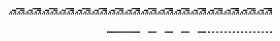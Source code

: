 \documentclass[10pt]{article}
\theoremstyle{plain}
\theoremstyle{definition}
\begin{document}
\begin{table*}[b]
{\begin{minipage}{5.32in}
\[\begin{array}{@{}r@{}}
\begin{array}{@{}l@{}}
\a\a\a\a\a\a\a\a\b\b\b\b\b\b\b\b\a\a\a\a\a\a\a\a\b\b\b\b\b\b\b\b\a\a\a\a \a\a\a\a\b\b\b\b\b\b\b\b\a\a\a\a\a\a\a\a\b\b\b\b\b\b\b\b\a\a\a\a\a\a\a\a \b\b\b\b\b\b\b\b\a\a\a\a\a\a\a\a\b\b\b\b\b\b\b\b\a\a\a\a\a\a\a\a\b\b\b\b \b\b\b\b\a\a\a\a\a\a\a\a\b\b\b\b\b\b\b\b\a\a\a\a\a\a\a\a\b\b\b\b\b\b\b\b \a\a\a\a\a\a\a\a\b\b\b\b\b\b\b\b\a\a\a\a\a\a\a\a\b\b\b\b\b\b\b\b\a\a\a\a \a\a\a\a\b\b\b\b\b\b\b\b\a\a\a\a\a\a\a\a\b\b\b\b\b\b\b\b\a\a\a\a\a\a\a\a \b\b\b\b\b\b\b\b\a\a\a\a\a\a\a\a\b\b\b\b\b\b\b\b\a\a\a\a\a\a\a\a\b\b\b\b \b\b\b\b\mynl
\a\a\a\a\b\b\b\b\a\a\a\a\b\b\b\b\a\a\a\a\b\b\b\b\a\a\a\a\b\b\b\b\a\a\a\a \b\b\b\b\a\a\a\a\b\b\b\b\a\a\a\a\b\b\b\b\a\a\a\a\b\b\b\b\a\a\a\a\b\b\b\b \a\a\a\a\b\b\b\b\a\a\a\a\b\b\b\b\a\a\a\a\b\b\b\b\a\a\a\a\b\b\b\b\a\a\a\a \b\b\b\b\a\a\a\a\b\b\b\b\a\a\a\a\b\b\b\b\a\a\a\a\b\b\b\b\a\a\a\a\b\b\b\b \a\a\a\a\b\b\b\b\a\a\a\a\b\b\b\b\a\a\a\a\b\b\b\b\a\a\a\a\b\b\b\b\a\a\a\a \b\b\b\b\a\a\a\a\b\b\b\b\a\a\a\a\b\b\b\b\a\a\a\a\b\b\b\b\a\a\a\a\b\b\b\b \a\a\a\a\b\b\b\b\a\a\a\a\b\b\b\b\a\a\a\a\b\b\b\b\a\a\a\a\b\b\b\b\a\a\a\a \b\b\b\b\mynl
\a\a\b\b\a\a\b\b\a\a\b\b\a\a\b\b\a\a\b\b\a\a\b\b\a\a\b\b\a\a\b\b\a\a\b\b \a\a\b\b\a\a\b\b\a\a\b\b\a\a\b\b\a\a\b\b\a\a\b\b\a\a\b\b\a\a\b\b\a\a\b\b \a\a\b\b\a\a\b\b\a\a\b\b\a\a\b\b\a\a\b\b\a\a\b\b\a\a\b\b\a\a\b\b\a\a\b\b \a\a\b\b\a\a\b\b\a\a\b\b\a\a\b\b\a\a\b\b\a\a\b\b\a\a\b\b\a\a\b\b\a\a\b\b \a\a\b\b\a\a\b\b\a\a\b\b\a\a\b\b\a\a\b\b\a\a\b\b\a\a\b\b\a\a\b\b\a\a\b\b \a\a\b\b\a\a\b\b\a\a\b\b\a\a\b\b\a\a\b\b\a\a\b\b\a\a\b\b\a\a\b\b\a\a\b\b \a\a\b\b\a\a\b\b\a\a\b\b\a\a\b\b\a\a\b\b\a\a\b\b\a\a\b\b\a\a\b\b\a\a\b\b \a\a\b\b\mynl
\a\b\a\b\a\b\a\b\a\b\a\b\a\b\a\b\a\b\a\b\a\b\a\b\a\b\a\b\a\b\a\b\a\b\a\b \a\b\a\b\a\b\a\b\a\b\a\b\a\b\a\b\a\b\a\b\a\b\a\b\a\b\a\b\a\b\a\b\a\b\a\b \a\b\a\b\a\b\a\b\a\b\a\b\a\b\a\b\a\b\a\b\a\b\a\b\a\b\a\b\a\b\a\b\a\b\a\b \a\b\a\b\a\b\a\b\a\b\a\b\a\b\a\b\a\b\a\b\a\b\a\b\a\b\a\b\a\b\a\b\a\b\a\b \a\b\a\b\a\b\a\b\a\b\a\b\a\b\a\b\a\b\a\b\a\b\a\b\a\b\a\b\a\b\a\b\a\b\a\b \a\b\a\b\a\b\a\b\a\b\a\b\a\b\a\b\a\b\a\b\a\b\a\b\a\b\a\b\a\b\a\b\a\b\a\b \a\b\a\b\a\b\a\b\a\b\a\b\a\b\a\b\a\b\a\b\a\b\a\b\a\b\a\b\a\b\a\b\a\b\a\b \a\b\a\b
\end{array}
\mynnl
\begin{array}{@{}l@{}}
\a\a\a\a\a\a\a\a\a\a\a\a\a\a\a\a\a\a\a\a\a\a\a\a\a\a\a\a\a\a\a\a\a\a\a\a \a\a\a\a\a\a\a\a\a\a\a\a\a\a\a\a\a\a\a\a\a\a\a\a\a\a\a\a\a\a\a\a\a\a\a\a \a\a\a\a\a\a\a\a\a\a\a\a\a\a\a\a\a\a\a\a\a\a\a\a\b\b\b\b\b\b\b\b\b\b\b\b \b\b\b\b\b\b\b\b\b\b\b\b\b\b\b\b\b\b\b\b\a\a\a\a\a\a\a\a\b\b\b\b\b\b\b\b \a\a\a\a\a\a\a\a\b\b\b\b\b\b\b\b\a\a\a\a\a\a\a\a\b\b\b\b\b\b\b\b\a\a\a\a \a\a\a\a\b\b\b\b\b\b\b\b\a\a\b\b\a\a\b\b\a\a\b\b\a\a\b\b\a\a\b\b\a\a\b\b \a\a\b\b\a\a\b\b\a\a\b\b\a\a\b\b\a\a\b\b\a\a\b\b\a\a\b\b\a\a\b\b\a\a\b\b \a\a\b\b\mynl

\end{array}
\end{array}\]
\end{minipage}}
\end{table*}
\end{document}

